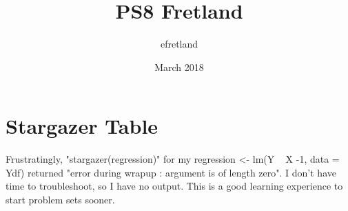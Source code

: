 \documentclass{article}
\title{PS8 Fretland}
\author{efretland }
\date{March 2018}
\begin{document}
\maketitle

\section{Stargazer Table}

Frustratingly, "stargazer(regression)" for my regression <- lm(Y ~ X -1, data = Ydf) returned "error during wrapup : argument is of length zero". I don't have time to troubleshoot, so I have no output. This is a good learning experience to start problem sets sooner. 
\end{document}
